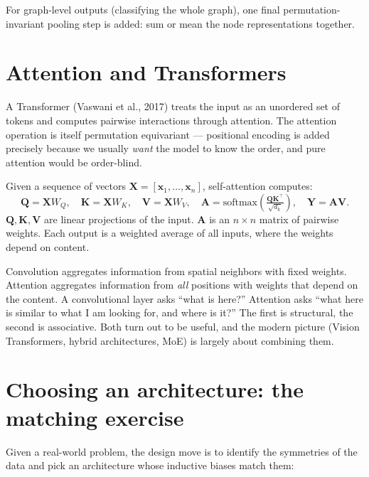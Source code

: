 For graph-level outputs (classifying the whole graph), one final permutation-invariant pooling step is added: sum or mean the node representations together.

\section{Attention and Transformers}

A Transformer (Vaswani et al., 2017) treats the input as an unordered set of tokens and computes pairwise interactions through attention. The attention operation is itself permutation equivariant --- positional encoding is added precisely because we usually \emph{want} the model to know the order, and pure attention would be order-blind.

\begin{definition}
Given a sequence of vectors $\bm{X} = [\bm{x}_1, \ldots, \bm{x}_n]$, self-attention computes:
\[
\bm{Q} = \bm{X} W_Q, \quad \bm{K} = \bm{X} W_K, \quad \bm{V} = \bm{X} W_V, \quad \bm{A} = \mathrm{softmax}\!\left( \tfrac{\bm{Q} \bm{K}^\top}{\sqrt{d_k}} \right), \quad \bm{Y} = \bm{A} \bm{V}.
\]
$\bm{Q}, \bm{K}, \bm{V}$ are linear projections of the input. $\bm{A}$ is an $n \times n$ matrix of pairwise weights. Each output is a weighted average of all inputs, where the weights depend on content.
\end{definition}

\begin{intuition}
Convolution aggregates information from spatial neighbors with fixed weights. Attention aggregates information from \emph{all} positions with weights that depend on the content. A convolutional layer asks ``what is here?'' Attention asks ``what here is similar to what I am looking for, and where is it?'' The first is structural, the second is associative. Both turn out to be useful, and the modern picture (Vision Transformers, hybrid architectures, MoE) is largely about combining them.
\end{intuition}

\section{Choosing an architecture: the matching exercise}

Given a real-world problem, the design move is to identify the symmetries of the data and pick an architecture whose inductive biases match them:

